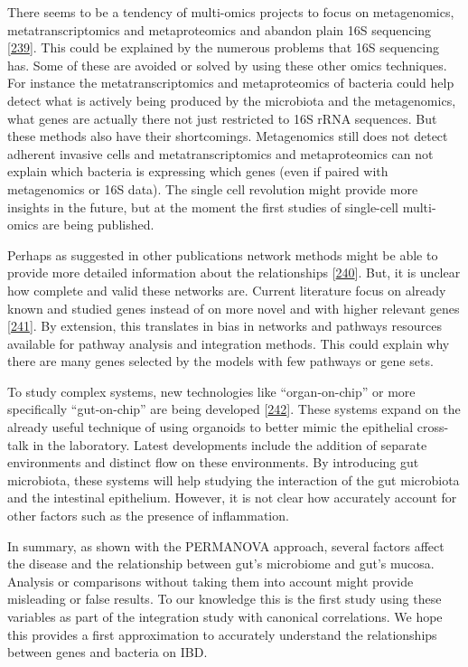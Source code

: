 \documentclass[
  12pt,
  a4paper,
  twoside,
  openright]{book}
\begin{document}
There seems to be a tendency of multi-omics projects to focus on metagenomics, metatranscriptomics and metaproteomics and abandon plain 16S sequencing {[}\protect\hyperlink{ref-zhang2019}{239}{]}.
This could be explained by the numerous problems that 16S sequencing has.
Some of these are avoided or solved by using these other omics techniques.
For instance the metatranscriptomics and metaproteomics of bacteria could help detect what is actively being produced by the microbiota and the metagenomics, what genes are actually there not just restricted to 16S rRNA sequences.
But these methods also have their shortcomings.
Metagenomics still does not detect adherent invasive cells and metatranscriptomics and metaproteomics can not explain which bacteria is expressing which genes (even if paired with metagenomics or 16S data).
The single cell revolution might provide more insights in the future, but at the moment the first studies of single-cell multi-omics are being published.

Perhaps as suggested in other publications network methods might be able to provide more detailed information about the relationships {[}\protect\hyperlink{ref-jiang2019}{240}{]}.
But, it is unclear how complete and valid these networks are.
Current literature focus on already known and studied genes instead of on more novel and with higher relevant genes {[}\protect\hyperlink{ref-haynes2018}{241}{]}.
By extension, this translates in bias in networks and pathways resources available for pathway analysis and integration methods.
This could explain why there are many genes selected by the models with few pathways or gene sets.

To study complex systems, new technologies like ``organ-on-chip'' or more specifically ``gut-on-chip'' are being developed {[}\protect\hyperlink{ref-collij2021}{242}{]}.
These systems expand on the already useful technique of using organoids to better mimic the epithelial cross-talk in the laboratory.
Latest developments include the addition of separate environments and distinct flow on these environments.
By introducing gut microbiota, these systems will help studying the interaction of the gut microbiota and the intestinal epithelium.
However, it is not clear how accurately account for other factors such as the presence of inflammation.

In summary, as shown with the PERMANOVA approach, several factors affect the disease and the relationship between gut's microbiome and gut's mucosa.
Analysis or comparisons without taking them into account might provide misleading or false results.
To our knowledge this is the first study using these variables as part of the integration study with canonical correlations.
We hope this provides a first approximation to accurately understand the relationships between genes and bacteria on IBD.
\end{document}
